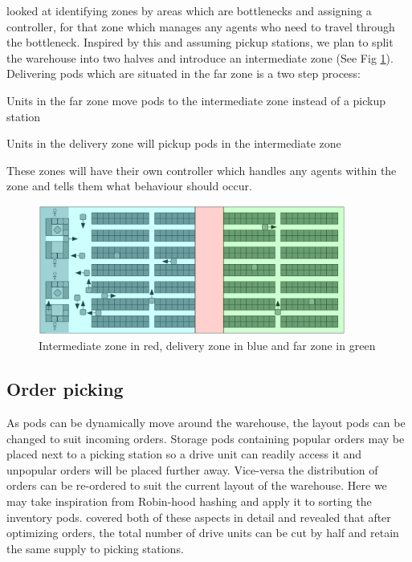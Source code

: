 \documentclass[a4paper,11pt]{article}
\begin{document}
\cite{wilt2014spatially} looked at identifying zones by areas which are bottlenecks and assigning a controller, for that zone which manages any agents who need to travel through the bottleneck. Inspired by this and assuming pickup stations, we plan to split the warehouse into two halves and introduce an intermediate zone (See Fig \ref{kivalayout2}). Delivering pods which are situated in the far zone is a two step process:
\begin{compactenum}
	\item Units in the far zone move pods to the intermediate zone instead of a pickup station
	\item Units in the delivery zone will pickup pods in the intermediate zone
\end{compactenum}
\noindent These zones will have their own controller which handles any agents within the zone and tells them what behaviour should occur.

\begin{figure}[h]
	\centering
	\includegraphics[width=0.9\textwidth]{graphics/kivasystemlayout_adjusted}
	\caption{Intermediate zone in red, delivery zone in blue and far zone in green}
	\label{kivalayout2}
\end{figure}

\subsection{Order picking}
As pods can be dynamically move around the warehouse, the layout pods can be changed to suit incoming orders. Storage pods containing popular orders may be placed next to a picking station so a drive unit can readily access it and unpopular orders will be placed further away. Vice-versa the distribution of orders can be re-ordered to suit the current layout of the warehouse. Here we may take inspiration from Robin-hood hashing and apply it to sorting the inventory pods. \cite{boysen2017parts} covered both of these aspects in detail and revealed that after optimizing orders, the total number of drive units can be cut by half and retain the same supply to picking stations.
\end{document}
